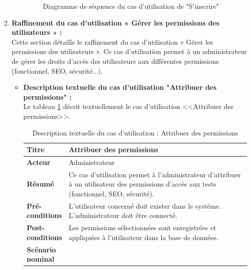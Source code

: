 \begin{enumerate}[label=\alph*), left=-0.1cm]
\begin{itemize}[label=, left=-0.1cm]
\begin{figure}[H]
                \caption{Diagramme de séquence du cas d’utilisation de "S'inscrire"}
                \label{fig:seqInscrire}
            \end{figure}
        \end{itemize}
    
  \item \textbf{Raffinement du cas d’utilisation « Gérer les permissions des utilisateurs » :}\\
    Cette section détaille le raffinement du cas d’utilisation « Gérer les permissions des utilisateurs ». Ce cas d’utilisation permet à un administrateur de gérer les droits d’accès des utilisateurs aux différentes permissions (fonctionnel, SEO, sécurité...).
     \begin{itemize}[label=, left=-0.1cm]
            \item \textbf{Description textuelle du cas d’utilisation "Attribuer des permissions" :}\\
            Le tableau \ref{tab:descAttribuerPermissions} décrit textuellement le cas d’utilisation <<Attribuer des permissions>>.
            \begin{spacing}{1.2}
                \begin{longtable}{|p{0.12\linewidth}|p{0.88\linewidth}|}
                \caption{Description textuelle du cas d’utilisation : Attribuer des permissions}
                \label{tab:descAttribuerPermissions} \\
                \hline
                \textbf{Titre} & Attribuer des permissions \\
                \hline
                \textbf{Acteur} & Administrateur \\
                \hline
                \textbf{Résumé} & Ce cas d'utilisation permet à l’administrateur d’attribuer à un utilisateur des permissions d’accès aux tests (fonctionnel, SEO, sécurité). \\
                \hline
                \textbf{Pré-conditions} & L’utilisateur concerné doit exister dans le système. L’administrateur doit être connecté. \\
                \hline
                \textbf{Post-conditions} & Les permissions sélectionnées sont enregistrées et appliquées à l’utilisateur dans la base de données. \\
                \hline
                \textbf{Scénario nominal} &
                \begin{minipage}{\linewidth}
                \vspace{0.1cm}

\end{minipage}
\end{longtable}
\end{spacing}
\end{itemize}
\end{enumerate}
